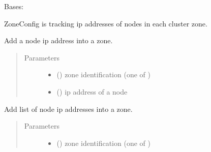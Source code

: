 \documentclass[letterpaper,10pt,english]{sphinxmanual}
\begin{document}
\begin{fulllineitems}
\label{\detokenize{ocpnetsplit:ocpnetsplit.zone.ZoneConfig}}
Bases: 

ZoneConfig is tracking ip addresses of nodes in each cluster zone.

\begin{fulllineitems}
\label{\detokenize{ocpnetsplit:ocpnetsplit.zone.ZoneConfig.add_node}}
Add a node ip address into a zone.
\begin{quote}\begin{description}
\item[{Parameters}] \leavevmode\begin{itemize}
\item {} 
 () \textendash{} zone identification (one of )

\item {} 
 () \textendash{} ip address of a node

\end{itemize}

\end{description}\end{quote}

\end{fulllineitems}


\begin{fulllineitems}
\label{\detokenize{ocpnetsplit:ocpnetsplit.zone.ZoneConfig.add_nodes}}
Add list of node ip addresses into a zone.
\begin{quote}\begin{description}
\item[{Parameters}] \leavevmode\begin{itemize}
\item {} 
 () \textendash{} zone identification (one of )


\end{itemize}
\end{description}
\end{quote}
\end{fulllineitems}
\end{fulllineitems}
\end{document}
